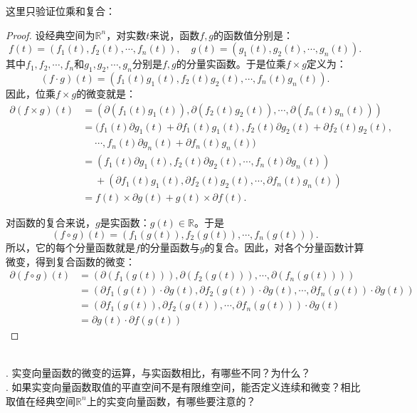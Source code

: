 \documentclass[12pt,UTF8,fontset=none]{ctexbook}
\begin{document}
这里只验证位乘和复合：
\begin{proof}
    设经典空间为$\mathbb{R}^n$，对实数$t$来说，函数$f,g$的函数值分别是：
    $$ f(t) = (f_1(t), f_2(t), \cdots, f_n(t)), \quad g(t) = (g_1(t), g_2(t), \cdots, g_n(t)). $$
    其中$f_1, f_2, \cdots, f_n$和$g_1, g_2, \cdots, g_n$分别是$f,g$的分量实函数。于是位乘$f \times g$定义为：
    $$ (f \cdot g)(t) = (f_1(t)g_1(t), f_2(t)g_2(t), \cdots, f_n(t)g_n(t)). $$
    因此，位乘$f\times g$的微变就是：
    \begin{align*}
        \partial (f \times g)(t) &= (\partial (f_1(t)g_1(t)), \partial (f_2(t)g_2(t)), \cdots, \partial (f_n(t)g_n(t))) \\
        &= (f_1(t)\partial g_1(t) + \partial f_1(t) g_1(t), f_2(t)\partial g_2(t) + \partial f_2(t) g_2(t), \\
        &\;\quad \cdots, f_n(t)\partial g_n(t) + \partial f_n(t) g_n(t)) \\
        &= (f_1(t)\partial g_1(t), f_2(t)\partial g_2(t), \cdots, f_n(t)\partial g_n(t)) \\
        &\;\quad + (\partial f_1(t) g_1(t), \partial f_2(t) g_2(t), \cdots, \partial f_n(t) g_n(t)) \\
        &= f(t) \times \partial g(t) + g(t) \times \partial f(t).
    \end{align*}

    对函数的复合来说，$g$是实函数：$g(t)\in\mathbb{R}$。于是
    $$ (f \circ g) (t) = (f_1(g(t)), f_2(g(t)), \cdots, f_n(g(t))). $$
    所以，它的每个分量函数就是$f$的分量函数与$g$的复合。因此，对各个分量函数计算微变，得到复合函数的微变：
    \begin{align*}
        \partial (f \circ g) (t) &= (\partial (f_1(g(t))), \partial (f_2(g(t))), \cdots, \partial (f_n(g(t)))) \\
        &= (\partial f_1(g(t)) \cdot \partial g(t), \partial f_2(g(t)) \cdot \partial g(t), \cdots, \partial f_n(g(t)) \cdot \partial g(t)) \\
        &= (\partial f_1(g(t)), \partial f_2(g(t)), \cdots, \partial f_n(g(t)) ) \cdot \partial g(t) \\
        &=  \partial g(t) \cdot \partial f(g(t))
    \end{align*}
    
\end{proof}

\begin{sk}
    \mbox{} \\
    . 实变向量函数的微变的运算，与实函数相比，有哪些不同？为什么？\\
    . 如果实变向量函数取值的平直空间不是有限维空间，能否定义连续和微变？相比取值在经典空间$\mathbb{R}^n$上的实变向量函数，有哪些要注意的？
\end{sk}
\end{document}
